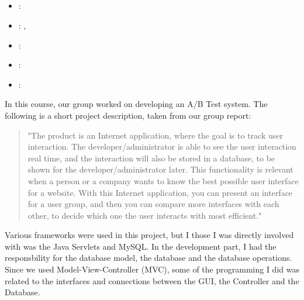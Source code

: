 \subsection[Applied Computer Science Project]{}
\label{sec:appl_comp_sci_proj}
\begin{itemize} 
	\item {}: 
	\item {}: , 
	\item {}: 
	\item {}: 
	\item {}: 
\end{itemize} 
In this course, our group worked on developing an A/B Test system. 
The following is a short project description, taken from our group report:
\begin{quote} 
"The product is an Internet application, where the goal is to track user interaction. 
The developer/administrator is able to see the user interaction real time, and the interaction will also be stored in a database, to be shown for the developer/administrator later. 
This functionality is relevant when a person or a company wants to know the best possible user interface for a website.
With this Internet application, you can present an interface for a user group, and then you can compare more interfaces with each other, 
to decide which one the user interacts with most efficient."
\end{quote}
Various frameworks were used in this project, but I those I was directly involved with was the Java Servlets and MySQL. 
In the development part, I had the responsbility for the database model, the database and the database operations. 
Since we used Model-View-Controller (MVC), some of the programming I did was related to the interfaces and connections between the GUI, the Controller and the Database.

